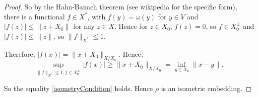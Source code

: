 \documentclass{unswmaths}
\begin{document}
\begin{proof}
    So by the Hahn-Banach theorem (see wikipedia for the specific form), there is a functional $f \in X^*$, with $f(y) = \omega(y)$ for $y \in V$
    and $|f(z)| \leq \|z+X_0\|$ for any $z \in X$. Hence for $z \in X_0$, $f(z) = 0$, so $f \in X_0^\perp$
    and $|f(z)|\leq \|z\|$, so $\|f\|_{X^*}\leq 1$. 
    
    Therefore, $|f(x)| = \|x+X_0\|_{X/X_0}$. Hence, 
    \begin{equation*}
        \sup_{\|f\|_{X^*} \leq 1, f \in X_0^\perp} |f(x)| \geq \|x+X_0\|_{X/X_0} =  \inf_{y \in X_0} \|x-y\|.
    \end{equation*}
    
    So the equality \ref{isometryCondition} holds. Hence $\rho$ is an isometric embedding.    
\end{proof}

    
\end{document}
